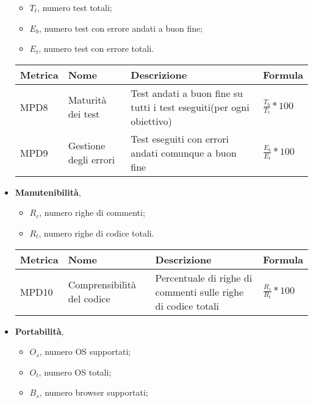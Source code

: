 \begin{itemize}
\begin{itemize}
                \item $T_t$, numero test totali;
                \item $E_b$, numero test con errore andati a buon fine;
                \item $E_t$, numero test con errore totali.
            \end{itemize}
            \begin{center}
                \begin{tabular}{|p{2cm}|p{3.5cm}|p{5.5cm}|p{3.5cm}|} \hline
                  \textbf{Metrica} & \textbf{Nome} & \textbf{Descrizione} & \textbf{Formula}    \\ \hline
                  MPD8 & Maturità dei test & Test andati a buon fine su tutti i test eseguiti(per ogni obiettivo) & $\frac{T_b}{T_t}*100$  \\ \hline
                  MPD9 & Gestione degli errori & Test eseguiti con errori andati comunque a buon fine & $\frac{E_b}{E_t}*100$  \\ \hline
                \end{tabular}
            \end{center}
        \item \textbf{Manutenibilità},
            \begin{itemize}
                \item $R_c$, numero righe di commenti;
                \item $R_t$, numero righe di codice totali.
            \end{itemize}
            \begin{center}
                \begin{tabular}{|p{2cm}|p{3.5cm}|p{5.5cm}|p{3.5cm}|} \hline
                  \textbf{Metrica} & \textbf{Nome} & \textbf{Descrizione} & \textbf{Formula}    \\ \hline
                  MPD10 & Comprensibilità del codice & Percentuale di righe di commenti sulle righe di codice totali & $\frac{R_c}{R_t}*100$  \\ \hline
                \end{tabular}
            \end{center}
        \item \textbf{Portabilità},
            \begin{itemize}
                \item $O_s$, numero OS supportati;
                \item $O_t$, numero OS totali;
                \item $B_s$, numero browser supportati;

\end{itemize}
\end{itemize}
